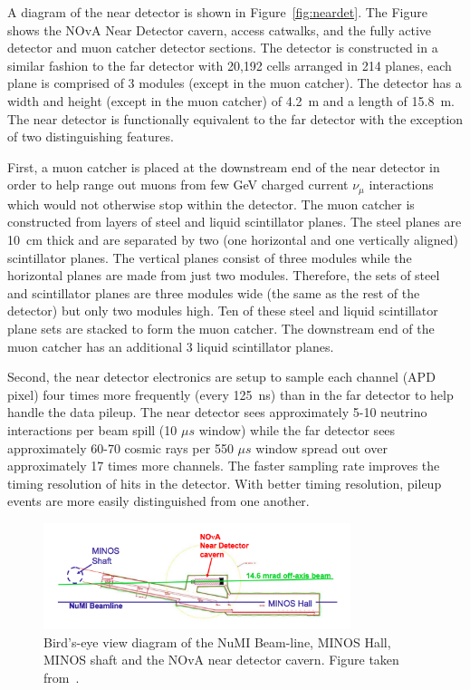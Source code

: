 A diagram of the near detector is shown in
Figure~\ref{fig:neardet}. The Figure shows the NOvA Near Detector
cavern, access catwalks, and the fully active detector and muon catcher
detector sections.
The detector is constructed in a similar fashion to the far detector
with 20,192 cells arranged in 214 planes, each plane is comprised of 3
modules (except in the muon catcher). The detector has a width and
height (except in the muon catcher) of 4.2~m and a length of
15.8~m. The near detector is
functionally equivalent to the far detector with the exception of two
distinguishing features.

First, a muon catcher is placed at the downstream end of the near
detector in order to help range out muons
from few GeV charged current $\nu_{\mu}$ interactions which would not
otherwise stop within the detector.
The muon catcher is constructed from layers of steel and liquid
scintillator planes. The steel planes are 10~cm
thick and are separated by 
two (one horizontal and one vertically aligned) scintillator planes.
The vertical planes consist of
three modules while the horizontal planes are made from just two
modules. Therefore, the sets of steel and scintillator planes are
three modules wide (the same as the rest of the detector) but only
two modules high. Ten of these steel and
liquid scintillator plane sets are stacked to form the muon
catcher. The downstream end of the muon catcher has an additional 3
liquid scintillator planes.

Second, the near detector electronics are setup to sample each channel
(APD pixel)
four times more frequently (every 125~ns) than in the far 
detector to help handle the data pileup. 
The near detector sees approximately 5-10 neutrino interactions per
beam spill (10 $\mu s$ window) while the far detector sees
approximately 60-70 cosmic rays per 550 $\mu s$ window spread out over
approximately 17 times more channels. The faster sampling rate
improves the timing resolution of hits in the detector. With better
timing resolution, pileup events are more easily distinguished from one
another. 




\begin{figure}
  \centering
  \includegraphics[width=0.8\textwidth]{../../img/baird/det/neardet_cavern_diagram.png}
  \caption{Bird's-eye view diagram of the NuMI Beam-line, MINOS Hall, MINOS
    shaft and the NOvA near detector cavern. Figure taken
    from~\cite{NuMI}.
  }
  \label{fig:cavern}
\end{figure}

